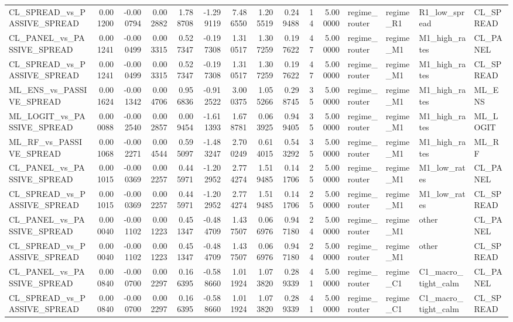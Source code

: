 \begin{table}
\begin{tabular}{lrrrrrrrrrrllll}
CL_SPREAD_vs_PASSIVE_SPREAD & 0.001200 & -0.000794 & 0.002882 & 1.788708 & -1.299119 & 7.486550 & 1.205519 & 0.249488 & 14 & 5.000000 & regime_router & regime_R1 & R1_low_spread & CL_SPREAD \\
CL_PANEL_vs_PASSIVE_SPREAD & 0.001241 & -0.000499 & 0.003315 & 0.527347 & -0.197308 & 1.310517 & 1.307259 & 0.197622 & 47 & 5.000000 & regime_router & regime_M1 & M1_high_rates & CL_PANEL \\
CL_SPREAD_vs_PASSIVE_SPREAD & 0.001241 & -0.000499 & 0.003315 & 0.527347 & -0.197308 & 1.310517 & 1.307259 & 0.197622 & 47 & 5.000000 & regime_router & regime_M1 & M1_high_rates & CL_SPREAD \\
ML_ENS_vs_PASSIVE_SPREAD & 0.001624 & -0.001342 & 0.004706 & 0.956836 & -0.912522 & 3.000375 & 1.055266 & 0.298745 & 35 & 5.000000 & regime_router & regime_M1 & M1_high_rates & ML_ENS \\
ML_LOGIT_vs_PASSIVE_SPREAD & 0.000088 & -0.002540 & 0.002857 & 0.009454 & -1.611393 & 1.678781 & 0.063925 & 0.949405 & 35 & 5.000000 & regime_router & regime_M1 & M1_high_rates & ML_LOGIT \\
ML_RF_vs_PASSIVE_SPREAD & 0.001068 & -0.002271 & 0.004544 & 0.595097 & -1.483247 & 2.700249 & 0.614015 & 0.543292 & 35 & 5.000000 & regime_router & regime_M1 & M1_high_rates & ML_RF \\
CL_PANEL_vs_PASSIVE_SPREAD & 0.001015 & -0.000369 & 0.002257 & 0.445971 & -1.202952 & 2.774274 & 1.519485 & 0.141706 & 25 & 5.000000 & regime_router & regime_M1 & M1_low_rates & CL_PANEL \\
CL_SPREAD_vs_PASSIVE_SPREAD & 0.001015 & -0.000369 & 0.002257 & 0.445971 & -1.202952 & 2.774274 & 1.519485 & 0.141706 & 25 & 5.000000 & regime_router & regime_M1 & M1_low_rates & CL_SPREAD \\
CL_PANEL_vs_PASSIVE_SPREAD & 0.000040 & -0.001102 & 0.001223 & 0.451347 & -0.484709 & 1.437507 & 0.066976 & 0.947180 & 24 & 5.000000 & regime_router & regime_M1 & other & CL_PANEL \\
CL_SPREAD_vs_PASSIVE_SPREAD & 0.000040 & -0.001102 & 0.001223 & 0.451347 & -0.484709 & 1.437507 & 0.066976 & 0.947180 & 24 & 5.000000 & regime_router & regime_M1 & other & CL_SPREAD \\
CL_PANEL_vs_PASSIVE_SPREAD & 0.000840 & -0.000700 & 0.002297 & 0.166395 & -0.588660 & 1.011924 & 1.073820 & 0.289339 & 41 & 5.000000 & regime_router & regime_C1 & C1_macro_tight_calm & CL_PANEL \\
CL_SPREAD_vs_PASSIVE_SPREAD & 0.000840 & -0.000700 & 0.002297 & 0.166395 & -0.588660 & 1.011924 & 1.073820 & 0.289339 & 41 & 5.000000 & regime_router & regime_C1 & C1_macro_tight_calm & CL_SPREAD \\

\end{tabular}
\end{table}
